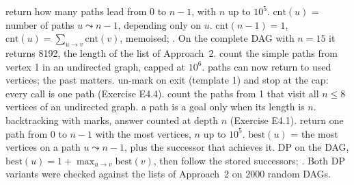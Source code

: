 \begin{variantsbox}
  {return how many paths lead from 0 to $n-1$, with $n$ up to $10^5$.}
  {$\text{cnt}(u)$ = number of paths $u \leadsto n-1$, depending only on $u$.}
  {$\text{cnt}(n-1) = 1$, $\text{cnt}(u) = \sum_{u \to v} \text{cnt}(v)$, memoised; \VE{}. On the complete DAG with $n = 15$ it returns 8192, the length of the list of Approach~2.}
  {count the simple paths from vertex 1 in an undirected graph, capped at $10^6$.}
  {paths can now return to used vertices; the past matters.}
  {un-mark on exit (template 1) and stop at the cap: every call is one path (Exercise E4.4).}
  {count the paths from 1 that visit all $n \le 8$ vertices of an undirected graph.}
  {a path is a goal only when its length is $n$.}
  {backtracking with marks, answer counted at depth $n$ (Exercise E4.1).}
  {return one path from 0 to $n-1$ with the most vertices, $n$ up to $10^5$.}
  {$\text{best}(u)$ = the most vertices on a path $u \leadsto n-1$, plus the successor that achieves it.}
  {DP on the DAG, $\text{best}(u) = 1 + \max_{u \to v} \text{best}(v)$, then follow the stored successors; \VE. Both DP variants were checked against the lists of Approach~2 on 2000 random DAGs.}
\end{variantsbox}
